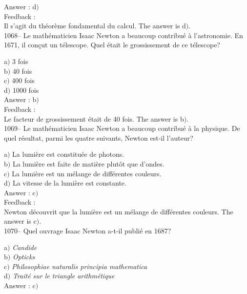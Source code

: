 \documentclass[letterpaper, 12pt]{article}
\begin{document}
Answer : d$)$ \\

Feedback : \\
Il s'agit du th\'eor\`eme fondamental du calcul.
The answer is d$)$.\\

1068-- Le math\'ematicien Isaac Newton a beaucoup contribu\'e \`a
l'astronomie. En 1671, il con\c cut un t\'elescope. Quel \'etait le
grossissement de ce t\'elescope?

a$)$ 3 fois \\
b$)$ 40 fois  \\
c$)$ 400 fois  \\
d$)$ 1000 fois \\

Answer : b$)$ \\

Feedback : \\
Le facteur de grossissement \'etait de 40 fois.
The answer is b$)$.\\

1069-- Le math\'ematicien Isaac Newton a beaucoup contribu\'e \`a la
physique. De quel r\'esultat, parmi les quatre suivants, Newton
est-il l'auteur?

a$)$ La lumi\`ere est constitu\'ee de photons. \\
b$)$ La lumi\`ere est faite de mati\`ere plut\^ot que d'ondes.  \\
c$)$ La lumi\`ere est un \og m\'elange de diff\'erentes couleurs\fg .  \\
d$)$ La vitesse de la lumi\`ere est constante.\\

Answer : c$)$ \\

Feedback : \\
Newton d\'ecouvrit que la lumi\`ere est un \og m\'elange de
diff\'erentes couleurs\fg .
The answer is c$)$.\\

1070-- Quel ouvrage Isaac Newton a-t-il publi\'e en 1687?

a$)$ {\sl Candide} \\
b$)$ {\sl Opticks}  \\
c$)$ {\sl Philosophiae naturalis principia mathematica}  \\
d$)$ {\sl Trait\'e sur le triangle arithm\'etique}\\

Answer : c$)$\\
\end{document}
